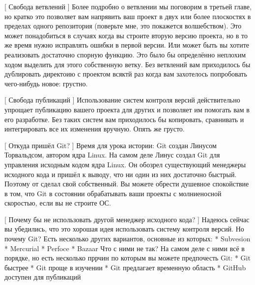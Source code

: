 [ Свобода ветвлений ]
Более подробно о ветвлении мы поговорим в третьей главе, но кратко это позволяет вам
напрявить ваш проект в двух или более плоскостях в пределах одного репозитория
(поверьте мне, это покажется волшебством). Это может понадобиться в случаях когда
вы строите вторую версию проекта, но в то же время нужно исправлять ошибки в первой 
версии. Или может быть вы хотите реализовать достаточно спорную функцию. Это было бы
определённо неплохим ходом выделить для этого собственную ветку. Без ветвлений вам 
приходилось бы дублировать директоию с проектом всяктй раз когда вам захотелось
попробовать чего-нибудь новое: грустно.

[ Свобода публикаций ]
Использование систем контроля версий действительно упрощает публикацию вашего проекта
для других и позволяет им помогать вам в его разработке. Без таких систем вам
приходилось бы копировать, сравнивать и интегрировать все их изменения вручную. Опять
же грусто.

[ Откуда пришёл Git? ]
Время для урока истории: Git создан Линусом Торвальдсом, автором ядра Linux. На самом
деле Линус создал Git для управления исходным кодом ядра Linux. Он обозрел
существующий менеджеры исходного кода и пришёл к выводу, что ни один из них
достаточно быстрый. Поэтому от сделал свой собственный. Вы можете обрести душевное
спокойствие в том, что Git в состоянии обрабатывать ваши проекты с молниеносной
скоростью, если вы не строите ОС.

[ Почему бы не использовать другой менеджер исходного кода? ]
Надеюсь сейчас вы убедились, что это хорошая идея использовать систему контроля
версий. Но почему Git? Есть несколько других вариантов, основные из которых:
	* Subvesion
	* Mercurial
	* Perfoce
	* Bazaar
Что с ними не так? На самом деле с ними всё в порядке, но есть несколько пррчин по
которым вы можете предпочесть Git:
 	* Git быстрее
 	* Git проще в изучении
 	* Git предлагает временную область
 	* GitHub доступен для публикаций
 